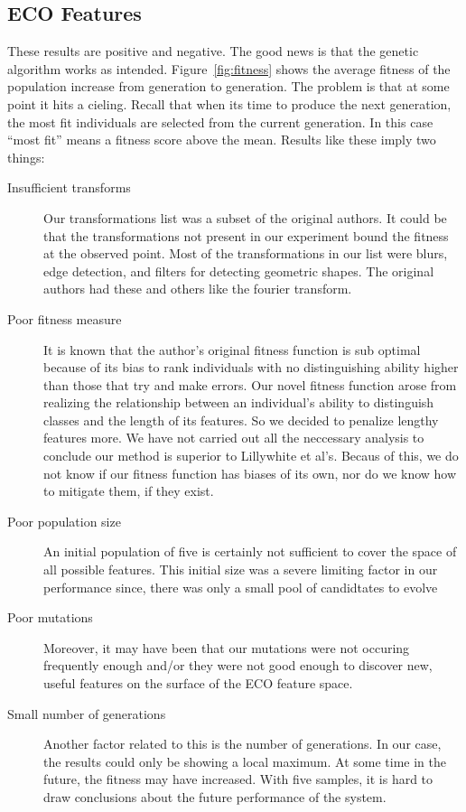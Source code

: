 \documentclass[conference]{IEEEtran}
\begin{document}
\subsection{ECO Features}
These results are positive and negative. The good news is that the genetic algorithm works as intended. Figure~\ref{fig:fitness} shows the average fitness of the population increase from generation to generation. The problem is that at some point it hits a cieling. Recall that when its time to produce the next generation, the most fit individuals are selected from the current generation. In this case ``most fit'' means a fitness score above the mean. Results like these imply two things:
\begin{description}
\item[Insufficient transforms]
  Our transformations list was a subset of the original authors. It could be that the transformations not present in our experiment bound the fitness at the observed point. Most of the transformations in our list were blurs, edge detection, and filters for detecting geometric shapes. The original authors had these and others like the fourier transform.
\item[Poor fitness measure]
  It is known that the author's original fitness function is sub optimal because of its bias to rank individuals with no distinguishing ability higher than those that try and make errors. Our novel fitness function arose from realizing the relationship between an individual's ability to distinguish classes and the length of its features. So we decided to penalize lengthy features more. We have not carried out all the neccessary analysis to conclude our method is superior to Lillywhite et al's. Becaus of this, we do not know if our fitness function has biases of its own, nor do we know how to mitigate them, if they exist. 
\item[Poor population size]
  An initial population of five is certainly not sufficient to cover the space of all possible features. This initial size was a severe limiting factor in our performance since, there was only a small pool of candidtates to evolve
\item[Poor mutations]
  Moreover, it may have been that our mutations were not occuring frequently enough and/or they were not good enough to discover new, useful features on the surface of the ECO feature space.
\item[Small number of generations]
  Another factor related to this is the number of generations. In our case, the results could only be showing a local maximum. At some time in the future, the fitness may have increased. With five samples, it is hard to draw conclusions about the future performance of the system.
\end{description}
\end{document}
